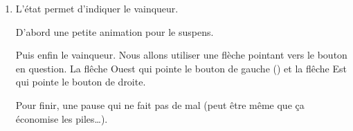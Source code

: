 \documentclass[letterpaper,10pt,french]{sphinxmanual}
\begin{document}
\begin{enumerate}
\item {} 
L’état  permet d’indiquer le vainqueur.

%
\begin{sphinxVerbatim}[commandchars=\\\{\}]
       
\end{sphinxVerbatim}

D’abord une petite animation pour le suspens.

%
\begin{sphinxVerbatim}[commandchars=\\\{\}]
           
\end{sphinxVerbatim}

Puis enfin le vainqueur. Nous allons utiliser une flèche pointant
vers le bouton en question. La flêche Ouest qui pointe le bouton de gauche
() et la flêche Est qui pointe le bouton  de droite.

%
\begin{sphinxVerbatim}[commandchars=\\\{\}]
           
           
          
\end{sphinxVerbatim}

Pour finir, une pause qui ne fait pas de mal (peut être même que
ça économise les piles…).

%
\begin{sphinxVerbatim}[commandchars=\\\{\}]
\end{sphinxVerbatim}

\end{enumerate}
\end{document}
